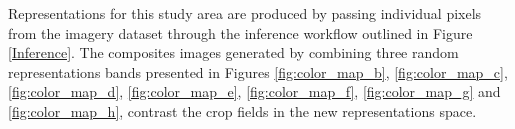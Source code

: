 \documentclass[journal,article,submit,pdftex,moreauthors]{Definitions/mdpi}
\begin{document}
Representations for this study area are produced by passing individual pixels from the imagery dataset through the inference workflow outlined in Figure \ref{Inference}. The composites images generated by combining three random representations bands presented in Figures \ref{fig:color_map_b}, \ref{fig:color_map_c}, \ref{fig:color_map_d}, \ref{fig:color_map_e}, \ref{fig:color_map_f}, \ref{fig:color_map_g} and \ref{fig:color_map_h}, contrast the crop fields in the new representations space.
\end{document}
